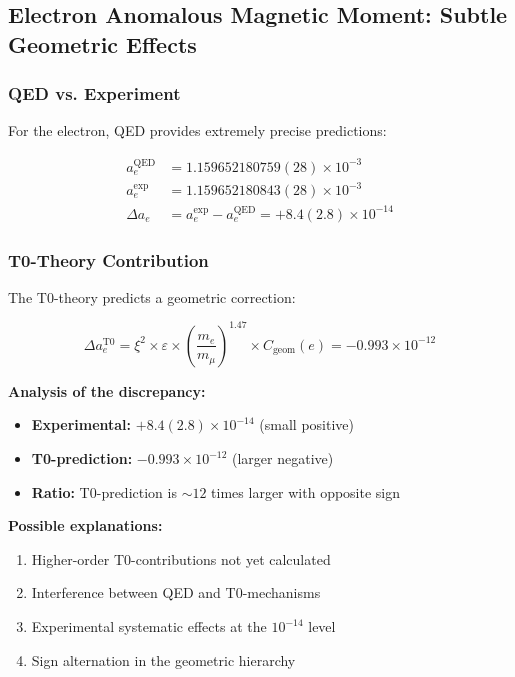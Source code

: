 \documentclass[12pt,a4paper]{article}
\numberwithin{equation}{section}
\newcommand{\xipar}{\xi}
\newcommand{\epsilonT}{\varepsilon}
\newcommand{\Cgeom}{C_{\text{geom}}}
\begin{document}
	\subsection{Electron Anomalous Magnetic Moment: Subtle Geometric Effects}
	
	\subsubsection{QED vs. Experiment}
	
	For the electron, QED provides extremely precise predictions:
	
	\begin{align}
		a_e^{\text{QED}} &= 1.159652180759(28) \times 10^{-3} \\
		a_e^{\exp} &= 1.159652180843(28) \times 10^{-3} \\
		\Delta a_e &= a_e^{\exp} - a_e^{\text{QED}} = +8.4(2.8) \times 10^{-14}
		\label{eq:electron_qed_comparison}
	\end{align}
	
	\subsubsection{T0-Theory Contribution}
	
	The T0-theory predicts a geometric correction:
	
	\begin{equation}
		\Delta a_e^{\text{T0}} = \xipar^2 \times \epsilonT \times \left(\frac{m_e}{m_\mu}\right)^{1.47} \times \Cgeom(e) = -0.993 \times 10^{-12}
		\label{eq:electron_t0_contribution}
	\end{equation}
	
	\textbf{Analysis of the discrepancy:}
	\begin{itemize}
		\item \textbf{Experimental:} $+8.4(2.8) \times 10^{-14}$ (small positive)
		\item \textbf{T0-prediction:} $-0.993 \times 10^{-12}$ (larger negative)
		\item \textbf{Ratio:} T0-prediction is $\sim 12$ times larger with opposite sign
	\end{itemize}
	
	\textbf{Possible explanations:}
	\begin{enumerate}
		\item Higher-order T0-contributions not yet calculated
		\item Interference between QED and T0-mechanisms
		\item Experimental systematic effects at the $10^{-14}$ level
		\item Sign alternation in the geometric hierarchy
	\end{enumerate}
	
\end{document}
